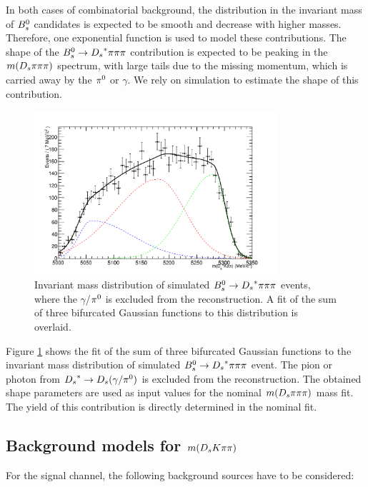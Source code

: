 In both cases of combinatorial background, the distribution in the invariant mass of ${{B}^0_{s}}$ candidates is expected to be smooth and decrease with higher masses. 
Therefore, one exponential function is used to model these contributions. \newline
The shape of the  ${{B}^0_{s}}\rightarrow{\ensuremath{{D}_{s}}}^{*}{\pi}{\pi}{\pi}$ contribution is expected to be peaking in the $m({{D}_{s}}{\pi}{\pi}{\pi})$ spectrum, with large tails due to the missing momentum, which is carried away by the ${{\pi}^0}$ or $\gamma$. 
We rely on simulation to estimate the shape of this contribution. 

\begin{figure}[h]
\includegraphics[height=8.cm,width=0.80\textwidth]{figs/Bs2Dsstartpipipi.pdf}
\caption{Invariant mass distribution of simulated ${{B}^0_{s}}\rightarrow{\ensuremath{{D}_{s}}}^{*}{\pi}{\pi}{\pi}$ events, where the $\gamma$/${{\pi}^0}$ is excluded from the reconstruction. 
A fit of the sum of three bifurcated Gaussian functions to this distribution is overlaid.}
\label{fig: BsDsstar3piMC}
\end{figure}

Figure \ref{fig: BsDsstar3piMC} shows the fit of the sum of three bifurcated Gaussian functions to the invariant mass distribution of simulated ${{B}^0_{s}}\rightarrow{\ensuremath{{D}_{s}}}^{*}{\pi}{\pi}{\pi}$ event. 
The pion or photon from ${{D}_{s}}^{*}\rightarrow{\ensuremath{{D}_{s}}}(\gamma/{{\pi}^0})$ is excluded from the reconstruction. The obtained shape parameters are used as input values for the nominal $m({{D}_{s}}{\pi}{\pi}{\pi})$ mass fit. 
The yield of this contribution is directly determined in the nominal fit. 


\subsection{Background models for $m({{D}_{s}}{K}{\pi}{\pi})$}
For the signal channel, the following background sources have to be considered:

